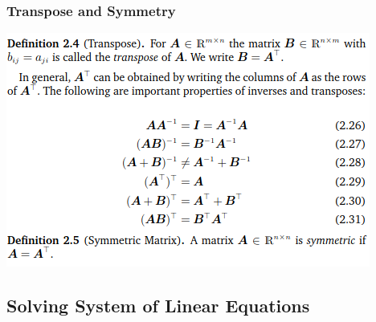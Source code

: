 \documentclass[oneside]{article}
\begin{document}
\begin{multicols}{2}
\subsubsection*{Transpose and Symmetry}
\includegraphics[width=\linewidth]{2.2_3}

\subsection{Solving System of Linear Equations}

\end{multicols}
\end{document}
